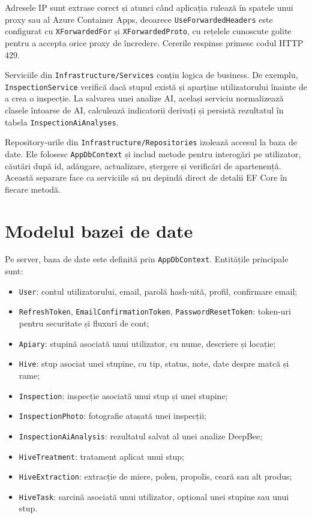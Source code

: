 Adresele IP sunt extrase corect și atunci când aplicația rulează în spatele unui proxy sau al Azure Container Apps, deoarece \texttt{UseForwardedHeaders} este configurat cu \texttt{XForwardedFor} și \texttt{XForwardedProto}, cu rețelele cunoscute golite pentru a accepta orice proxy de încredere. Cererile respinse primesc codul HTTP 429.

Serviciile din \texttt{Infrastructure/Services} conțin logica de business. De exemplu, \texttt{InspectionService} verifică dacă stupul există și aparține utilizatorului înainte de a crea o inspecție. La salvarea unei analize AI, același serviciu normalizează clasele întoarse de AI, calculează indicatorii derivați și persistă rezultatul în tabela \texttt{InspectionAiAnalyses}.

Repository-urile din \texttt{Infrastructure/Repositories} izolează accesul la baza de date. Ele folosesc \texttt{AppDbContext} și includ metode pentru interogări pe utilizator, căutări după id, adăugare, actualizare, ștergere și verificări de apartenență. Această separare face ca serviciile să nu depindă direct de detalii EF Core în fiecare metodă.

\section{Modelul bazei de date}

Pe server, baza de date este definită prin \texttt{AppDbContext}. Entitățile principale sunt:
\begin{itemize}
	\item \texttt{User}: contul utilizatorului, email, parolă hash-uită, profil, confirmare email;
	\item \texttt{RefreshToken}, \texttt{EmailConfirmationToken}, \texttt{PasswordResetToken}: token-uri pentru securitate și fluxuri de cont;
	\item \texttt{Apiary}: stupină asociată unui utilizator, cu nume, descriere și locație;
	\item \texttt{Hive}: stup asociat unei stupine, cu tip, status, note, date despre matcă și rame;
	\item \texttt{Inspection}: inspecție asociată unui stup și unei stupine;
	\item \texttt{InspectionPhoto}: fotografie atașată unei inspecții;
	\item \texttt{InspectionAiAnalysis}: rezultatul salvat al unei analize DeepBee;
	\item \texttt{HiveTreatment}: tratament aplicat unui stup;
	\item \texttt{HiveExtraction}: extracție de miere, polen, propolis, ceară sau alt produs;
	\item \texttt{HiveTask}: sarcină asociată unui utilizator, opțional unei stupine sau unui stup.
\end{itemize}

